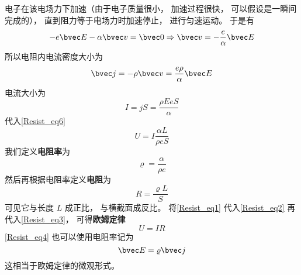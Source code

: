 电子在该电场力下加速（由于电子质量很小， 加速过程很快， 可以假设是一瞬间完成的）， 直到阻力等于电场力时加速停止， 进行匀速运动。 于是有
\begin{equation}
-e\bvec E - \alpha \bvec v = \bvec 0 \Rightarrow \bvec v = -\frac{e}{\alpha}\bvec E
\end{equation}
所以电阻内电流密度大小为
\begin{equation}\label{Resist_eq4}
\bvec j = -\rho \bvec v = \frac{e\rho}{\alpha}\bvec E
\end{equation}
电流大小为
\begin{equation}
I = jS = \frac{\rho EeS}{\alpha}
\end{equation}
代入\autoref{Resist_eq6} 
\begin{equation}\label{Resist_eq3}
U = I \frac{\alpha L}{\rho eS}
\end{equation}
我们定义\textbf{电阻率}为
\begin{equation}\label{Resist_eq1}
\varrho = \frac{\alpha}{\rho e}
\end{equation}
然后再根据电阻率定义\textbf{电阻}为
\begin{equation}\label{Resist_eq2}
R = \frac{\varrho L}{S}
\end{equation}
可见它与长度 $L$ 成正比， 与横截面成反比。 将\autoref{Resist_eq1} 代入\autoref{Resist_eq2} 再代入\autoref{Resist_eq3}， 可得\textbf{欧姆定律}
\begin{equation}
U = IR
\end{equation}
\autoref{Resist_eq4} 也可以使用电阻率记为
\begin{equation}
\bvec E = \varrho\bvec j
\end{equation}
这相当于欧姆定律的微观形式。
